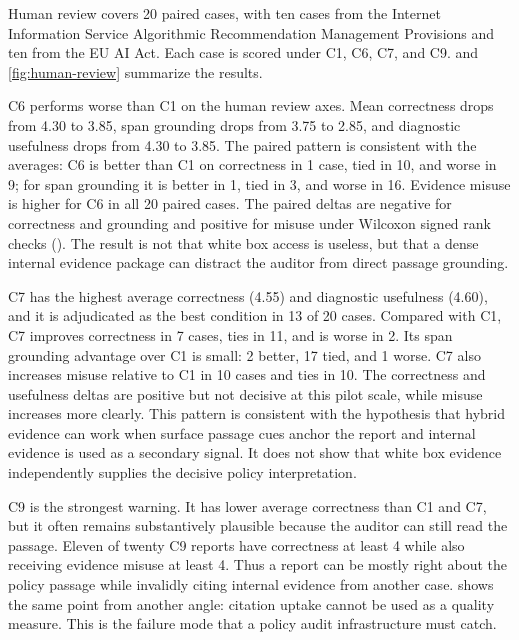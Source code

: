 \documentclass{article}
\begin{document}
Human review covers 20 paired cases, with ten cases from the Internet Information Service Algorithmic Recommendation Management Provisions and ten from the EU AI Act. Each case is scored under C1, C6, C7, and C9.  and \cref{fig:human-review} summarize the results.

C6 performs worse than C1 on the human review axes. Mean correctness drops from 4.30 to 3.85, span grounding drops from 3.75 to 2.85, and diagnostic usefulness drops from 4.30 to 3.85. The paired pattern is consistent with the averages: C6 is better than C1 on correctness in 1 case, tied in 10, and worse in 9; for span grounding it is better in 1, tied in 3, and worse in 16. Evidence misuse is higher for C6 in all 20 paired cases. The paired deltas are negative for correctness and grounding and positive for misuse under Wilcoxon signed rank checks (). The result is not that white box access is useless, but that a dense internal evidence package can distract the auditor from direct passage grounding.

C7 has the highest average correctness (4.55) and diagnostic usefulness (4.60), and it is adjudicated as the best condition in 13 of 20 cases. Compared with C1, C7 improves correctness in 7 cases, ties in 11, and is worse in 2. Its span grounding advantage over C1 is small: 2 better, 17 tied, and 1 worse. C7 also increases misuse relative to C1 in 10 cases and ties in 10. The correctness and usefulness deltas are positive but not decisive at this pilot scale, while misuse increases more clearly. This pattern is consistent with the hypothesis that hybrid evidence can work when surface passage cues anchor the report and internal evidence is used as a secondary signal. It does not show that white box evidence independently supplies the decisive policy interpretation.

C9 is the strongest warning. It has lower average correctness than C1 and C7, but it often remains substantively plausible because the auditor can still read the passage. Eleven of twenty C9 reports have correctness at least 4 while also receiving evidence misuse at least 4. Thus a report can be mostly right about the policy passage while invalidly citing internal evidence from another case.  shows the same point from another angle: citation uptake cannot be used as a quality measure. This is the failure mode that a policy audit infrastructure must catch.
\end{document}
